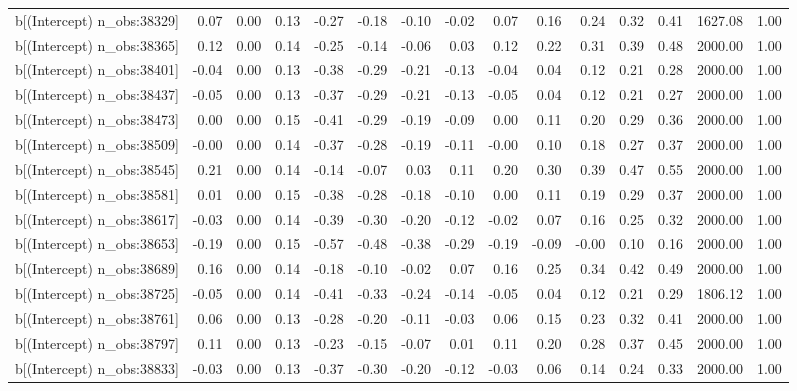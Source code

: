 \begin{table}[ht]
\begin{tabular}{rrrrrrrrrrrrrrr}
  b[(Intercept) n\_obs:38329] & 0.07 & 0.00 & 0.13 & -0.27 & -0.18 & -0.10 & -0.02 & 0.07 & 0.16 & 0.24 & 0.32 & 0.41 & 1627.08 & 1.00 \\ 
  b[(Intercept) n\_obs:38365] & 0.12 & 0.00 & 0.14 & -0.25 & -0.14 & -0.06 & 0.03 & 0.12 & 0.22 & 0.31 & 0.39 & 0.48 & 2000.00 & 1.00 \\ 
  b[(Intercept) n\_obs:38401] & -0.04 & 0.00 & 0.13 & -0.38 & -0.29 & -0.21 & -0.13 & -0.04 & 0.04 & 0.12 & 0.21 & 0.28 & 2000.00 & 1.00 \\ 
  b[(Intercept) n\_obs:38437] & -0.05 & 0.00 & 0.13 & -0.37 & -0.29 & -0.21 & -0.13 & -0.05 & 0.04 & 0.12 & 0.21 & 0.27 & 2000.00 & 1.00 \\ 
  b[(Intercept) n\_obs:38473] & 0.00 & 0.00 & 0.15 & -0.41 & -0.29 & -0.19 & -0.09 & 0.00 & 0.11 & 0.20 & 0.29 & 0.36 & 2000.00 & 1.00 \\ 
  b[(Intercept) n\_obs:38509] & -0.00 & 0.00 & 0.14 & -0.37 & -0.28 & -0.19 & -0.11 & -0.00 & 0.10 & 0.18 & 0.27 & 0.37 & 2000.00 & 1.00 \\ 
  b[(Intercept) n\_obs:38545] & 0.21 & 0.00 & 0.14 & -0.14 & -0.07 & 0.03 & 0.11 & 0.20 & 0.30 & 0.39 & 0.47 & 0.55 & 2000.00 & 1.00 \\ 
  b[(Intercept) n\_obs:38581] & 0.01 & 0.00 & 0.15 & -0.38 & -0.28 & -0.18 & -0.10 & 0.00 & 0.11 & 0.19 & 0.29 & 0.37 & 2000.00 & 1.00 \\ 
  b[(Intercept) n\_obs:38617] & -0.03 & 0.00 & 0.14 & -0.39 & -0.30 & -0.20 & -0.12 & -0.02 & 0.07 & 0.16 & 0.25 & 0.32 & 2000.00 & 1.00 \\ 
  b[(Intercept) n\_obs:38653] & -0.19 & 0.00 & 0.15 & -0.57 & -0.48 & -0.38 & -0.29 & -0.19 & -0.09 & -0.00 & 0.10 & 0.16 & 2000.00 & 1.00 \\ 
  b[(Intercept) n\_obs:38689] & 0.16 & 0.00 & 0.14 & -0.18 & -0.10 & -0.02 & 0.07 & 0.16 & 0.25 & 0.34 & 0.42 & 0.49 & 2000.00 & 1.00 \\ 
  b[(Intercept) n\_obs:38725] & -0.05 & 0.00 & 0.14 & -0.41 & -0.33 & -0.24 & -0.14 & -0.05 & 0.04 & 0.12 & 0.21 & 0.29 & 1806.12 & 1.00 \\ 
  b[(Intercept) n\_obs:38761] & 0.06 & 0.00 & 0.13 & -0.28 & -0.20 & -0.11 & -0.03 & 0.06 & 0.15 & 0.23 & 0.32 & 0.41 & 2000.00 & 1.00 \\ 
  b[(Intercept) n\_obs:38797] & 0.11 & 0.00 & 0.13 & -0.23 & -0.15 & -0.07 & 0.01 & 0.11 & 0.20 & 0.28 & 0.37 & 0.45 & 2000.00 & 1.00 \\ 
  b[(Intercept) n\_obs:38833] & -0.03 & 0.00 & 0.13 & -0.37 & -0.30 & -0.20 & -0.12 & -0.03 & 0.06 & 0.14 & 0.24 & 0.33 & 2000.00 & 1.00 \\ 

\end{tabular}
\end{table}
